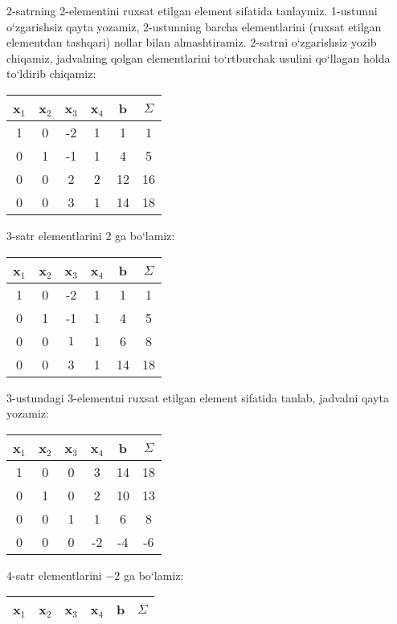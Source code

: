 \begin{enumerate}
2-satrning 2-elementini ruxsat etilgan element sifatida tanlaymiz. 1-ustunni o`zgarishsiz qayta yozamiz, 2-ustunning barcha elementlarini (ruxsat etilgan elementdan tashqari) nollar bilan almashtiramiz. 2-satrni o`zgarishsiz yozib chiqamiz, jadvalning qolgan elementlarini  to`rtburchak usulini qo`llagan holda to`ldirib chiqamiz:
\begin{center}
	\begin{tabular}{|c|c|c|c|c|c|}
		\hline
		\textbf{x}$_{1}$&\textbf{x}$_{2}$&\textbf{x}$_{3}$&\textbf{x}$_{4}$&\textbf{b}&$\Sigma$\\ \hline
		
		1&0&-2&1&1&1\\ \hline
		0&1&-1&1&4&5\\ \hline
		0&0&2&2&12&16\\ \hline
		0&0&3&1&14&18\\ \hline
	\end{tabular}
\end{center}
3-satr elementlarini 2 ga bo`lamiz:
\begin{center}
	\begin{tabular}{|c|c|c|c|c|c|}
		\hline
		\textbf{x}$_{1}$&\textbf{x}$_{2}$&\textbf{x}$_{3}$&\textbf{x}$_{4}$&\textbf{b}&$\Sigma$\\ \hline
		
		1&0&-2&1&1&1\\ \hline
		0&1&-1&1&4&5\\ \hline
		0&0&$\boxed{1}$&1&6&8\\ \hline
		0&0&3&1&14&18\\ \hline
	\end{tabular}
\end{center}
3-ustundagi 3-elementni ruxsat etilgan element sifatida tanlab, jadvalni qayta yozamiz:
\begin{center}
	\begin{tabular}{|c|c|c|c|c|c|}
		\hline
		\textbf{x}$_{1}$&\textbf{x}$_{2}$&\textbf{x}$_{3}$&\textbf{x}$_{4}$&\textbf{b}&$\Sigma$\\ \hline
		
		1&0&0&3&14&18\\ \hline
		0&1&0&2&10&13\\ \hline
		0&0&1&1&6&8\\ \hline
		0&0&0&-2&-4&-6\\ \hline	
	\end{tabular}
\end{center}

4-satr elementlarini  $-2$ ga bo`lamiz:
\begin{center}
	\begin{tabular}{|c|c|c|c|c|c|}
		\hline
		\textbf{x}$_{1}$&\textbf{x}$_{2}$&\textbf{x}$_{3}$&\textbf{x}$_{4}$&\textbf{b}&$\Sigma$\\ \hline
		

\end{tabular}
\end{center}
\end{enumerate}
